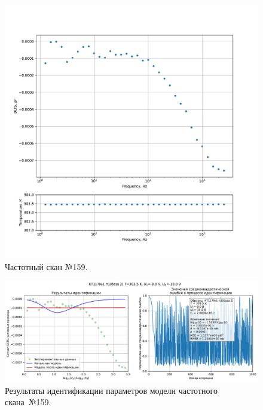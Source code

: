 \begin{figure}[!ht]
    \centering
    \includegraphics[width=1\textwidth]{../plots/КТ117№1_п1(база 2)_2500Гц-1Гц_1пФ_+30С_-9В-10В_20мВ_20мкс_шаг_0,1.pdf}
    \caption{Частотный скан №159.}
    \label{pic:frequency_scan_159}
\end{figure}

\begin{figure}[!ht]
    \centering
    \includegraphics[width=1\textwidth]{../plots/КТ117№1_п1(база 2)_2500Гц-1Гц_1пФ_+30С_-9В-10В_20мВ_20мкс_шаг_0,1_model.pdf}
    \caption{Результаты идентификации параметров модели частотного скана~№159.}
    \label{pic:frequency_scan_model159}
\end{figure}

\pagebreak


